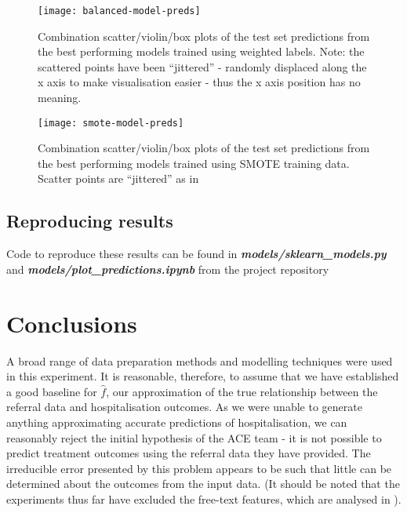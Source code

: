 \begin{figure}[H]
    \centering
    \texttt{[image: balanced-model-preds]}
    \caption[Plots of test set predictions for weighted label models]{Combination scatter/violin/box plots of the test set predictions from the best performing models trained using weighted labels. Note: the scattered points have been ``jittered'' - randomly displaced along the x axis to make visualisation easier - thus the x axis position has no meaning.}
    \label{fig:balanced-preds}
\end{figure}

\begin{figure}[H]
    \centering
    \texttt{[image: smote-model-preds]}
    \caption[Plots of test set predictions for SMOTE models]{Combination scatter/violin/box plots of the test set predictions from the best performing models trained using SMOTE training data. Scatter points are ``jittered'' as in }
    \label{fig:smote-preds}
\end{figure}
\subsection{Reproducing results}\label{subsec:reproducing-results-classification}

Code to reproduce these results can be found in \textbf{\textit{models/sklearn\_models.py}} and \linebreak \textbf{\textit{models/plot\_predictions.ipynb}} from the project repository

\section{Conclusions}\label{sec:conclusions}

A broad range of data preparation methods and modelling techniques were used in this experiment. It is reasonable, therefore, to assume that we have established a good baseline for $\hat{f}$, our approximation of the true relationship between the referral data and hospitalisation outcomes.  As we were unable to generate anything approximating accurate predictions of hospitalisation, we can reasonably reject the initial hypothesis of the ACE team - it is not possible to predict treatment outcomes using the referral data they have provided. The irreducible error presented by this problem appears to be such that little can be determined about the outcomes from the input data. (It should be noted that the experiments thus far have excluded the free-text features, which are analysed in ).

